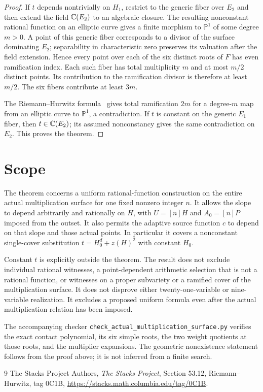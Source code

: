 \documentclass[11pt,a4paper]{article}
\begin{document}
\begin{proof}
If $t$ depends nontrivially on $H_1$, restrict to the generic
fiber over $E_2$ and then extend the field $\mathbb C(E_2)$ to an algebraic
closure. The resulting nonconstant rational function on an elliptic
curve gives a finite morphism to $\mathbb P^1$ of some degree $m>0$.
A point of this generic fiber corresponds to a divisor of the surface
dominating $E_2$; separability in characteristic zero preserves its
valuation after the field extension. Hence every point over each of
the six distinct roots of $F$ has even ramification index. Each such
fiber has total multiplicity $m$ and at most $m/2$ distinct points.
Its contribution to the ramification divisor is therefore at least
$m/2$. The six fibers contribute at least $3m$.

The Riemann--Hurwitz formula~\cite{RH} gives total ramification $2m$ for a
degree-$m$ map from an elliptic curve to $\mathbb P^1$, a contradiction.
If $t$ is constant on the generic $E_1$ fiber, then
$t\in\mathbb C(E_2)$; its assumed nonconstancy gives the same contradiction
on $E_2$. This proves the theorem.
\end{proof}

\section*{Scope}

The theorem concerns a uniform rational-function construction on the
entire actual multiplication surface for one fixed nonzero integer
$n$. It allows the slope to depend arbitrarily and rationally on
$H$, with $U=[n]H$ and $A_0=[n]P$ imposed from the outset.
It also permits the adaptive source function $c$ to depend on that
slope and those actual points. In particular it covers a nonconstant
single-cover substitution $t=H_0^d+z(H)^2$ with constant $H_0$.

Constant $t$ is explicitly outside the theorem. The result does not
exclude individual rational witnesses, a point-dependent arithmetic
selection that is not a rational function, or witnesses on a proper
subvariety or a ramified cover of the multiplication surface. It
does not disprove either twenty-one-variable or nine-variable
realization. It excludes a proposed uniform formula even after the
actual multiplication relation has been imposed.

The accompanying checker
\nolinkurl{check_actual_multiplication_surface.py}
verifies the exact contact polynomial, its six simple roots, the two
weight quotients at those roots, and the multiplier expansions.
The geometric nonexistence statement follows from the proof above;
it is not inferred from a finite search.

\begin{thebibliography}{9}
The Stacks Project Authors, \emph{The Stacks Project},
Section 53.12, Riemann--Hurwitz, tag 0C1B,
\url{https://stacks.math.columbia.edu/tag/0C1B}.
\end{thebibliography}
\end{document}
